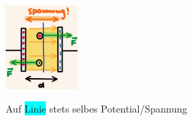         \vspace{-1mm}
            \begin{minipage}{0.41\linewidth}
                \begin{footnotesize}
                    \begin{center}
                        \vspace{2mm}
                        \includegraphics[width = 27mm]{src/images/hom_potentialfeld.png}
                    \end{center}
                \end{footnotesize}
            \end{minipage}
            \begin{minipage}{0.58\linewidth}
                \begin{scriptsize}
                    \begin{center}
                        Auf \colorbox{Cyan}{Linie} stets selbes Potential/Spannung
                    \end{center}
                \end{scriptsize}
            \end{minipage}
            \vspace{1mm}